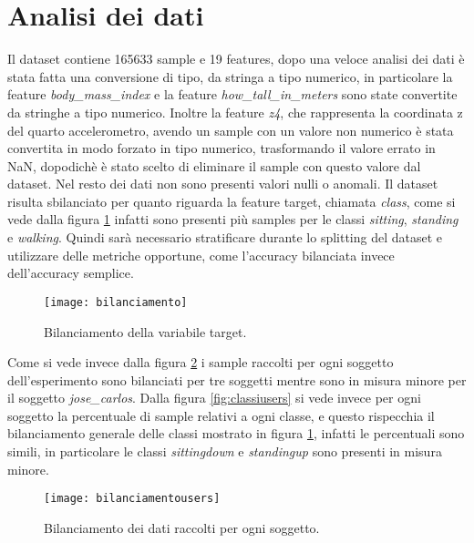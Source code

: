 \section{Analisi dei dati}\label{sec:analisi}

Il dataset \cite{datasetarticle} contiene 165633 sample e 19 features, dopo una veloce analisi dei dati è stata fatta una conversione di tipo, da stringa a tipo numerico, in particolare la feature \textit{body\_mass\_index} e la feature \textit{how\_tall\_in\_meters} sono state convertite da stringhe a tipo numerico. Inoltre la feature \textit{z4}, che rappresenta la coordinata z del quarto accelerometro, avendo un sample con un valore non numerico è stata convertita in modo forzato in tipo numerico, trasformando il valore errato in NaN, dopodichè è stato scelto di eliminare il sample con questo valore dal dataset.  Nel resto dei dati non sono presenti valori nulli o anomali.
Il dataset risulta sbilanciato per quanto riguarda la feature target, chiamata \textit{class}, come si vede dalla figura \ref{fig:bilanciamento} infatti sono presenti più samples per le classi \textit{sitting}, \textit{standing} e \textit{walking}. Quindi sarà necessario stratificare durante lo splitting del dataset e utilizzare delle metriche opportune, come l'accuracy bilanciata invece dell'accuracy semplice.

\begin{figure}[h]
    \centering\texttt{[image: bilanciamento]}
    \caption{Bilanciamento della variabile target.}
    \label{fig:bilanciamento}
\end{figure}

Come si vede invece dalla figura \ref{fig:bilanciamentousers} i sample raccolti per ogni soggetto dell'esperimento sono bilanciati per tre soggetti mentre sono in misura minore per il soggetto \textit{jose\_carlos}. Dalla figura \ref{fig:classiusers} si vede invece per ogni soggetto la percentuale di sample relativi a ogni classe, e questo rispecchia il bilanciamento generale delle classi mostrato in figura \ref{fig:bilanciamento}, infatti le percentuali sono simili, in particolare le classi \textit{sittingdown} e \textit{standingup} sono presenti in misura minore.

\begin{figure}[h]
    \centering\texttt{[image: bilanciamentousers]}
    \caption{Bilanciamento dei dati raccolti per ogni soggetto.}
    \label{fig:bilanciamentousers}
\end{figure}

